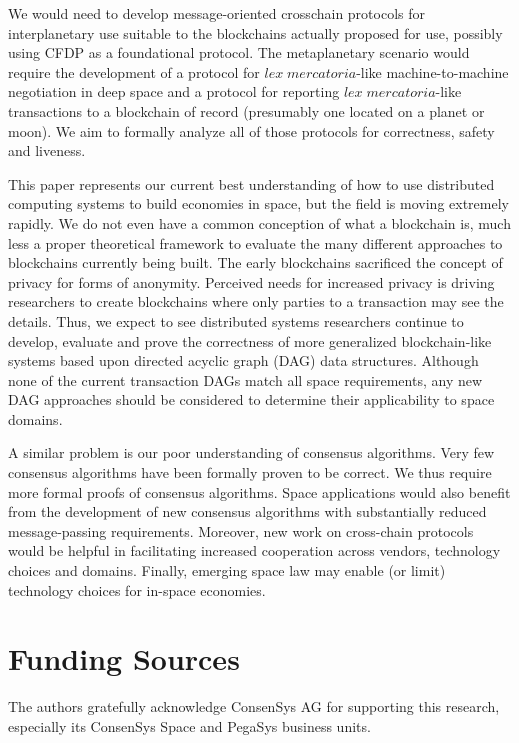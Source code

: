 \documentclass[journal ]{new-aiaa}
\begin{document}
We would need to develop message-oriented crosschain protocols for interplanetary use suitable to the blockchains actually proposed for use, possibly using CFDP as a foundational protocol. The metaplanetary scenario would require the development of  a protocol for $\mathit{lex\; mercatoria}$-like machine-to-machine negotiation in deep space and a protocol for reporting $\mathit{lex\; mercatoria}$-like transactions to a blockchain of record (presumably one located on a planet or moon). We aim to formally analyze all of those protocols for correctness, safety and liveness.

This paper represents our current best understanding of how to use distributed computing systems to build economies in space, but the field is moving extremely rapidly. We do not even have a common conception of what a blockchain is, much less a proper theoretical framework to evaluate the many different approaches to blockchains currently being built. The early blockchains sacrificed the concept of privacy for forms of anonymity. Perceived needs for increased privacy is driving researchers to create blockchains where only parties to a transaction may see the details. Thus, we expect to see distributed systems researchers continue to develop, evaluate and prove the correctness of more generalized blockchain-like systems based upon directed acyclic graph (DAG) data structures. Although none of the current transaction DAGs match all space requirements, any new DAG approaches should be considered to determine their applicability to space domains.

A similar problem is our poor understanding of consensus algorithms. Very few consensus algorithms have been formally proven to be correct. We thus require more formal proofs of consensus algorithms. Space applications would also benefit from the development of new consensus algorithms with substantially reduced message-passing requirements. Moreover, new work on cross-chain protocols would be helpful in facilitating increased cooperation across vendors, technology choices and domains. Finally, emerging space law may enable (or limit) technology choices for in-space economies.


\section*{Funding Sources}

The authors gratefully acknowledge ConsenSys AG for supporting this research, especially its ConsenSys Space and PegaSys business units.



\end{document}
